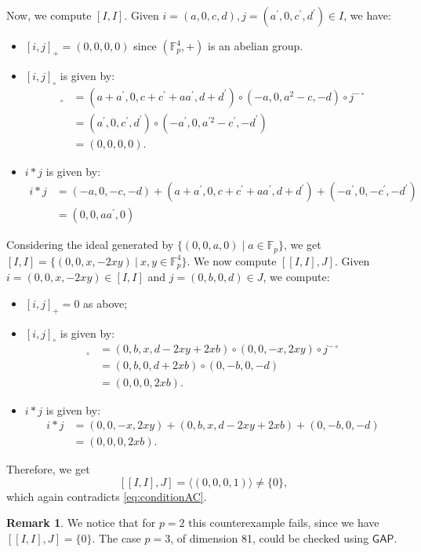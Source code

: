 \documentclass{amsart}
\theoremstyle{definition}
\newtheorem{remark}[theorem]{Remark}
\begin{document}
Now, we compute $[I,I]$. Given $i=(a,0,c,d), j=(a^\prime,0,c^\prime,d^\prime) \in I$, we have:
\begin{itemize}
    \item $[i,j]_+=(0,0,0,0)$ since $(\mathbb{F}^4_p,+)$ is an abelian group.
    \item $[i,j]_\circ$ is given by:
    \begin{align*}
        [i,j]_\circ &= (a+a^\prime,0,c+c^\prime +aa^\prime, d+d^\prime) \circ (-a,0,a^2-c,-d) \circ j^{-\circ}\\
        &= (a^\prime,0,c^\prime,d^\prime) \circ (-a^\prime,0,a^{\prime 2}-c^\prime,-d^\prime) \\
        &= (0,0,0, 0).
    \end{align*}
    \item $i*j$ is given by:
    \begin{align*}
        i*j&=(-a,0,-c,-d)+(a+a^\prime,0,c+c^\prime +aa^\prime, d+d^\prime)+ (-a^\prime,0,-c^\prime,-d^\prime)\\
        &=(0,0,aa^\prime, 0)
    \end{align*}
\end{itemize}
Considering the ideal generated by $\{(0,0,a,0) \mid a \in \mathbb{F}_p\}$, we get $[I,I]=\{(0,0,x,-2xy)\ |\ x,y\in\mathbb{F}^{4}_{p}\}$. We now compute $[[I,I],J]$. Given $i=(0,0,x,-2xy) \in [I,I]$ and $j=(0,b,0,d) \in J$, we compute:
\begin{itemize}
    \item $[i,j]_+=0$ as above;
    \item $[i,j]_\circ$ is given by:
    \begin{align*}
        [i,j]_\circ &= (0,b,x,d-2xy+2xb) \circ (0,0,-x,2xy) \circ j^{-\circ}\\
        &=(0,b,0,d+2xb) \circ (0,-b,0,-d) \\
        &= (0,0,0,2xb).
    \end{align*}
    \item $i*j$ is given by:
    \begin{align*}
        i*j&=(0,0,-x,2xy)+(0,b,x,d-2xy+2xb)+(0,-b,0,-d)\\
        &=(0,0,0,2xb).
    \end{align*}
\end{itemize}


Therefore, we get 
$$
[[I,I],J]=\langle(0,0,0,1)\rangle\neq \{0\},
$$
which again contradicts \eqref{eq:conditionAC}.

\begin{remark}
We notice that for $p=2$ this counterexample fails, since we have $[[I,I],J]=\{0\}$. The case $p=3$, of dimension 81, could be checked using $\mathsf{GAP}$. 
\end{remark}
\end{document}
